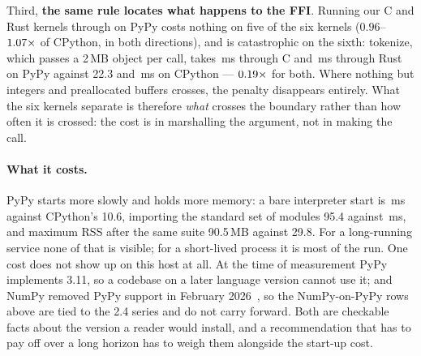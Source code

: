 Third, \textbf{the same rule locates what happens to the FFI}. Running our C and Rust kernels
through  on PyPy costs nothing on five of the six kernels ($0.96$--$\meas{ratio:b2_branchy-314:binarytrees/rust_ctypes|b2_branchy-pypy311:binarytrees/rust_ctypes}{1.07}\times$ of
CPython, in both directions), and is catastrophic on the sixth: tokenize, which passes a 2\,MB
 object per call, takes \,ms through C and \,ms through Rust on PyPy
against 22.3 and \,ms on CPython --- $\meas{ratio:b2_branchy-314:tokenize/c_ctypes|b2_branchy-pypy311:tokenize/c_ctypes}{0.19}\times$ for both. Where nothing but integers and
preallocated buffers crosses, the penalty disappears entirely. What the six kernels separate is
therefore \emph{what} crosses the boundary rather than how often it is crossed: the cost is in
marshalling the argument, not in making the call.

\paragraph{What it costs.} PyPy starts more slowly and holds more memory: a bare interpreter
start is \,ms against CPython's 10.6, importing the standard set of modules 95.4 against
\,ms, and maximum RSS after the same suite 90.5\,MB against 29.8. For a long-running service
none of that is visible; for a short-lived process it is most of the run. One cost does not show
up on this host at all. At the time of measurement PyPy implements 3.11, so a codebase on a
later language version cannot use it; and NumPy removed PyPy support in February
2026~\cite{numpy-drop-pypy}, so the NumPy-on-PyPy rows above are tied to the 2.4 series and do
not carry forward. Both are checkable facts about the version a reader would install, and a
recommendation that has to pay off over a long horizon has to weigh them alongside the start-up
cost.

